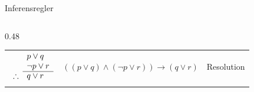 \begin{frame}{Inferensregler}
\begin{columns}
\begin{column}{0.48\textwidth}
\begin{tabular}{>{\footnotesize}p{1.6cm} | >{\scriptsize}p{2.8cm} | >{\footnotesize}p{1.6cm}}
            \noalign{\vspace{3pt}}
            $\begin{array}{ r l }
                    & p \lor q \\
                    & \lnot p \lor r \\
                    \cline{2-2}
                    \therefore & q \lor r
                \end{array}$
            & $((p \lor q) \land (\lnot p \lor r)) \rightarrow (q \lor r)$
            & Resolution \\ \noalign{\vspace{3pt}}  \hline
            \noalign{\vspace{3pt}}
        \end{tabular}
        \end{column}
    \end{columns}
\end{frame}

